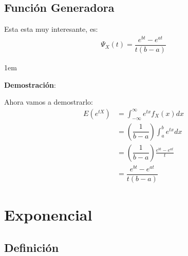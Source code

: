 \documentclass[12pt, fleqn]{report}                             %
\newenvironment{SmallIndentation}[1][0.75em]                    %
        {\begin{adjustwidth}{#1}{}\begin{footnotesize}}             %
        {\end{footnotesize}\end{adjustwidth}}                       %
\theoremstyle{break}                                            %
\newcommand{\Wrap}[1]{\left( #1 \right)}                        %
\newcommand{\pfrac}[2]{\Wrap{\dfrac{#1}{#2}}}                   %
\begin{document}
            \subsection{Función Generadora}

                Esta esta muy interesante, es:
                \begin{align*}
                    \Psi_X(t) = \dfrac{e^{bt} - e^{at}}{t(b -a)}
                \end{align*}

                \begin{SmallIndentation}[1em]
                    \textbf{Demostración}:
                    
                    Ahora vamos a demostrarlo:
                    \begin{align*}
                        E(e^{tX}) 
                            &= \int_{-\infty}^\infty e^{tx} f_X (x) dx              \\
                            &= \pfrac{1}{b-a} \int_a^b e^{tx} dx                    \\
                            &= \pfrac{1}{b-a} \frac{e^{bt} - e^{at}}{t}             \\
                            &= \dfrac{e^{bt} - e^{at}}{t(b -a)}
                    \end{align*}

                \end{SmallIndentation}
                    



        \clearpage
        \section{Exponencial}

            \subsection{Definición}
\end{document}
